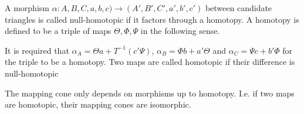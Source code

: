     \begin{definition}
        A morphism $\alpha : A,B,C,a,b,c) \rightarrow (A',B',C',a',b',c')$ between candidate triangles is called null-homotopic if it factors through a homotopy. A homotopy is defined to be a triple of maps $\Theta, \Phi, \Psi$ in the following sense.
        \begin{center}
        \end{center}
        It is required that $\alpha_A  = \Theta a + T^{-1}(c'\Psi)$, $\alpha_B = \Phi b + a'\Theta$ and $\alpha_C = \Psi c + b'\Phi$ for the triple to be a homotopy.
        Two maps are called homotopic if their difference is null-homotopic
    \end{definition}

    \begin{lemma}
        The mapping cone only depends on morphisms up to homotopy. I.e. if two maps are homotopic, their mapping cones are isomorphic.
    \end{lemma}

